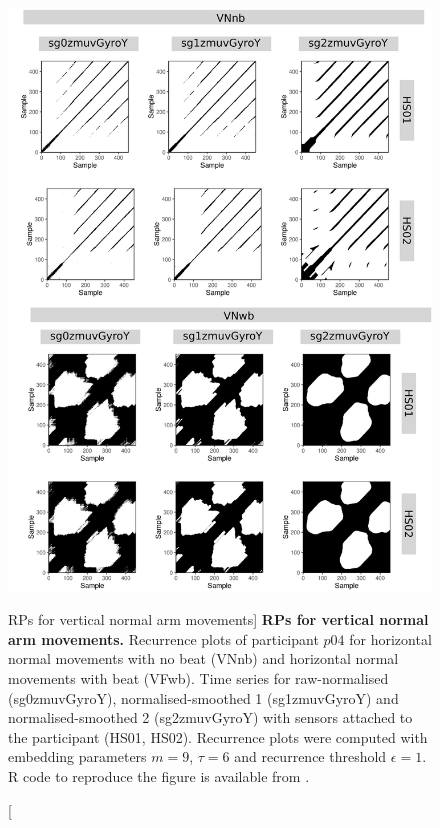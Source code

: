 \begin{figure}
\centering
\includegraphics[height=0.8\textheight]{rps_VN_w500_p04}
\caption
	[RPs for vertical normal arm movements]{
	{\bf RPs for vertical normal arm movements.}	
	Recurrence plots of participant $p04$ for 
	horizontal normal movements with no beat (VNnb) and
	horizontal normal movements with beat (VFwb).
	Time series for raw-normalised (sg0zmuvGyroY), 
	normalised-smoothed 1 (sg1zmuvGyroY) and 
	normalised-smoothed 2 (sg2zmuvGyroY) with
	sensors attached to the participant (HS01, HS02).
	Recurrence plots were computed with 
	embedding parameters $m=9$, $\tau=6$ and 
	recurrence threshold $\epsilon=1$.
	R code to reproduce the figure is available from \cite{hwum2018}.
        }
    \label{fig:rps_VN_w500_p04}
\end{figure}




